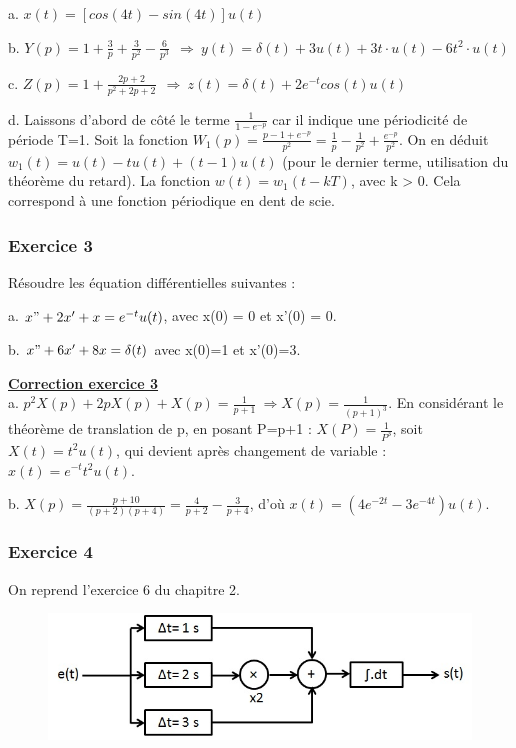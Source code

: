 \documentclass[11pt]{report}
\begin{document}
	a. $x(t)=[cos(4t)-sin(4t)]u(t)$
	
	b. $Y(p)=1+\frac{3}{p}+\frac{3}{p^{2}}-\frac{6}{p^{3}} ~~\Longrightarrow~ y(t)=\delta(t)+3u(t)+3t\cdot u(t)-6t^{2}\cdot u(t)$
	
	c. $Z(p)=1+\frac{2p+2}{p^{2}+2p+2}~~\Longrightarrow~z(t)=\delta(t)+2e^{-t}cos(t)u(t)$
	
	d. Laissons d'abord de côté le terme $\frac{1}{1-e^{-p}}$ car il indique une périodicité de période T=1. Soit la fonction $W_{1}(p)= \frac{p-1+e^{-p}}{p^{2}}=\frac{1}{p}-\frac{1}{p^{2}}+\frac{e^{-p}}{p^{2}}$. On en déduit $w_{1}(t)=u(t)-tu(t)+(t-1)u(t)$ (pour le dernier terme, utilisation du théorème du retard). La fonction $w(t) =w_{1}(t-kT)$, avec k > 0. Cela correspond à une fonction périodique en dent de scie.
	
	
	\vspace{1\baselineskip}
	
	\subsubsection{Exercice 3}
	
	Résoudre les équation différentielles suivantes :
	
	a. $x"+2x'+x=e^{-t}u(t)$, avec x(0) = 0 et x'(0) = 0. 
	
	b. $x"+6x'+8x=\delta(t)$ avec x(0)=1 et x'(0)=3. 
	
	\vspace{1\baselineskip}
	
	\textbf{\underline{Correction exercice 3}}\\
	
	a. $p^{2}X(p)+2pX(p)+X(p)=\frac{1}{p+1}~\Rightarrow X(p)=\frac{1}{(p+1)^{3}}$. En considérant le théorème de translation de p, en posant P=p+1 : $X(P)=\frac{1}{P^{3}}$, soit $X(t)=t^{2}u(t)$, qui devient après changement de variable : $x(t)=e^{-t}t^{2}u(t)$.
	
	b. $X(p)=\frac{p+10}{(p+2)(p+4)} = \frac{4}{p+2}-\frac{3}{p+4}$, d'où $x(t) = (4e^{-2t}-3e^{-4t})u(t)$.
	
	\vspace{1\baselineskip}
	
	
	\subsubsection{Exercice 4}
	
	On reprend l'exercice 6 du chapitre 2.
	
	
	\begin{figure}[h!]
		\centering
		\includegraphics[scale=0.5]{images/Exo_2_6.jpg} 
	\end{figure}
	
\end{document}
